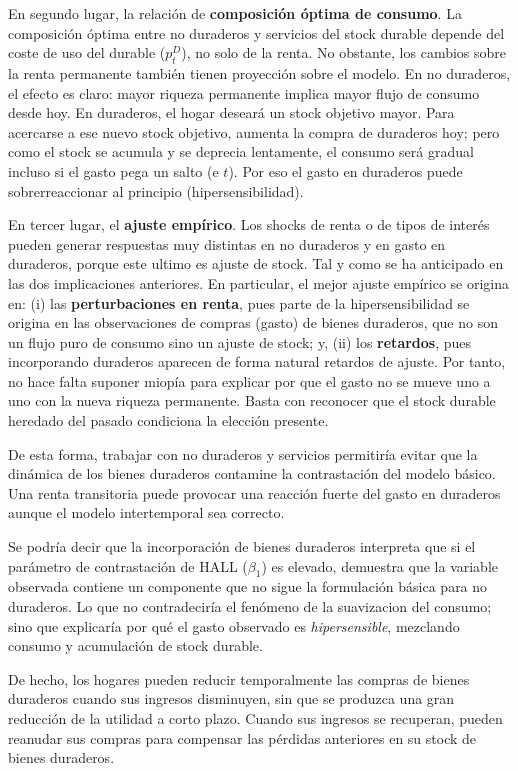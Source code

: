 \documentclass[10pt,a4paper]{article}
\begin{document}
En segundo lugar, la relación de \textbf{composición óptima de consumo}. La composición óptima entre no duraderos y servicios del stock durable depende del coste de uso del durable ($p_t^D$), no solo de la renta. No obstante, los cambios sobre la renta permanente también tienen proyección sobre el modelo. En no duraderos, el efecto es claro: mayor riqueza permanente implica mayor flujo de consumo desde hoy. En duraderos, el hogar deseará un stock objetivo mayor. Para acercarse a ese nuevo stock objetivo, aumenta la compra de duraderos hoy; pero como el stock se acumula y se deprecia lentamente, el consumo será gradual incluso si el gasto pega un salto (e $t$). Por eso el gasto en duraderos puede sobrerreaccionar al principio (hipersensibilidad).

En tercer lugar, el \textbf{ajuste empírico}. Los shocks de renta o de tipos de interés pueden generar respuestas muy distintas en no duraderos y en gasto en duraderos, porque este ultimo es ajuste de stock. Tal y como se ha anticipado en las dos implicaciones anteriores. En particular, el mejor ajuste empírico se origina en: (i) las \textbf{perturbaciones en renta}, pues parte de la hipersensibilidad se origina en las observaciones de compras (gasto) de bienes duraderos, que no son un flujo puro de consumo sino un ajuste de stock; y, (ii) los \textbf{retardos}, pues incorporando duraderos aparecen de forma natural retardos de ajuste. Por tanto, no hace falta suponer miopía para explicar por que el gasto no se mueve uno a uno con la nueva riqueza permanente. Basta con reconocer que el stock durable heredado del pasado condiciona la elección presente.

De esta forma, trabajar con no duraderos y servicios permitiría evitar que la dinámica de los bienes duraderos contamine la contrastación del modelo básico. Una renta transitoria puede provocar una reacción fuerte del gasto en duraderos aunque el modelo intertemporal sea correcto. 

Se podría decir que la incorporación de bienes duraderos interpreta que si el parámetro de contrastación de HALL ($\beta_1$) es elevado, demuestra que la variable observada contiene un componente que no sigue la formulación básica para no duraderos. Lo que no contradeciría el fenómeno de la suavizacion del consumo; sino que explicaría por qué el gasto observado es \textit{hipersensible}, mezclando consumo y acumulación de stock durable. 

De hecho, los hogares pueden reducir temporalmente las compras de bienes duraderos cuando sus ingresos disminuyen, sin que se produzca una gran reducción de la utilidad a corto plazo. Cuando sus ingresos se recuperan, pueden reanudar sus compras para compensar las pérdidas anteriores en su stock de bienes duraderos.
\end{document}
